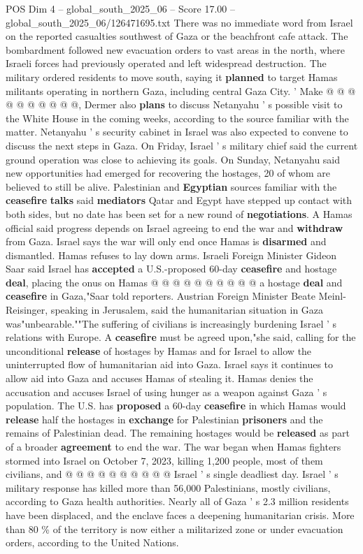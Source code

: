 \begin{textsample}{POS Dim 4 – global\_south\_2025\_06 – Score 17.00 – global\_south\_2025\_06/126471695.txt}
There was no immediate word from Israel on the reported casualties southwest of Gaza or the beachfront cafe attack.
The bombardment followed new evacuation orders to vast areas in the north, where Israeli forces had previously operated and left widespread destruction.
The military ordered residents to move south, saying it \textbf{planned} to target Hamas militants operating in northern Gaza, including central Gaza City. ' Make @ @ @ @ @ @ @ @ @ @, Dermer also \textbf{plans} to discuss Netanyahu ' s possible visit to the White House in the coming weeks, according to the source familiar with the matter.
Netanyahu ' s security cabinet in Israel was also expected to convene to discuss the next steps in Gaza.
On Friday, Israel ' s military chief said the current ground operation was close to achieving its goals.
On Sunday, Netanyahu said new opportunities had emerged for recovering the hostages, 20 of whom are believed to still be alive.
Palestinian and \textbf{Egyptian} sources familiar with the \textbf{ceasefire} \textbf{talks} said \textbf{mediators} Qatar and Egypt have stepped up contact with both sides, but no date has been set for a new round of \textbf{negotiations}.
A Hamas official said progress depends on Israel agreeing to end the war and \textbf{withdraw} from Gaza.
Israel says the war will only end once Hamas is \textbf{disarmed} and dismantled.
Hamas refuses to lay down arms.
Israeli Foreign Minister Gideon Saar said Israel has \textbf{accepted} a U.S.-proposed 60-day \textbf{ceasefire} and hostage \textbf{deal}, placing the onus on Hamas @ @ @ @ @ @ @ @ @ @ a hostage \textbf{deal} and \textbf{ceasefire} in Gaza,"Saar told reporters.
Austrian Foreign Minister Beate Meinl-Reisinger, speaking in Jerusalem, said the humanitarian situation in Gaza was"unbearable.""The suffering of civilians is increasingly burdening Israel ' s relations with Europe.
A \textbf{ceasefire} must be agreed upon,"she said, calling for the unconditional \textbf{release} of hostages by Hamas and for Israel to allow the uninterrupted flow of humanitarian aid into Gaza.
Israel says it continues to allow aid into Gaza and accuses Hamas of stealing it.
Hamas denies the accusation and accuses Israel of using hunger as a weapon against Gaza ' s population.
The U.S. has \textbf{proposed} a 60-day \textbf{ceasefire} in which Hamas would \textbf{release} half the hostages in \textbf{exchange} for Palestinian \textbf{prisoners} and the remains of Palestinian dead.
The remaining hostages would be \textbf{released} as part of a broader \textbf{agreement} to end the war.
The war began when Hamas fighters stormed into Israel on October 7, 2023, killing 1,200 people, most of them civilians, and @ @ @ @ @ @ @ @ @ @ Israel ' s single deadliest day.
Israel ' s military response has killed more than 56,000 Palestinians, mostly civilians, according to Gaza health authorities.
Nearly all of Gaza ' s 2.3 million residents have been displaced, and the enclave faces a deepening humanitarian crisis.
More than 80 \% of the territory is now either a militarized zone or under evacuation orders, according to the United Nations.


\end{textsample}
